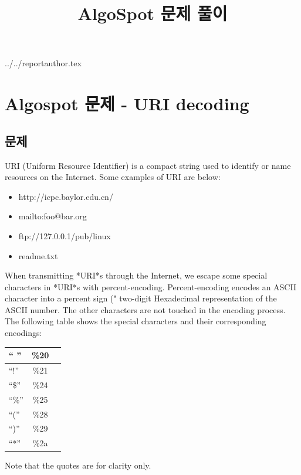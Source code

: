 \documentclass {article}
\begin{document}
\title {AlgoSpot 문제 풀이}
 {../../reportauthor.tex}
\maketitle

\section {Algospot 문제 - URI decoding}
\subsection {문제}
URI (Uniform Resource Identifier) is a compact string used to identify or name resources on the Internet. Some examples of URI are below:

\begin{itemize}
\item http://icpc.baylor.edu.cn/
\item mailto:foo@bar.org
\item ftp://127.0.0.1/pub/linux
\item readme.txt
\end{itemize}

When transmitting *URI*s through the Internet, we escape some
special characters in *URI*s with percent-encoding. Percent-encoding
encodes an ASCII character into a percent sign ("%
two-digit Hexadecimal representation of the ASCII number. The other
characters are not touched in the encoding process. The following
table shows the special characters and their corresponding encodings:
\newline

\begin {tabular}{| l | c | r |}
  \hline
  `` '' & \%20 \\ \hline
  ``!'' & \%21 \\ \hline
  ``\$'' & \%24 \\ \hline
  ``\%'' & \%25 \\ \hline
  ``('' & \%28 \\ \hline
  ``)'' & \%29 \\ \hline
  ``*'' & \%2a \\ \hline
\end{tabular}
\linebreak
\newline
\newline

Note that the quotes are for clarity only.
\end{document}

